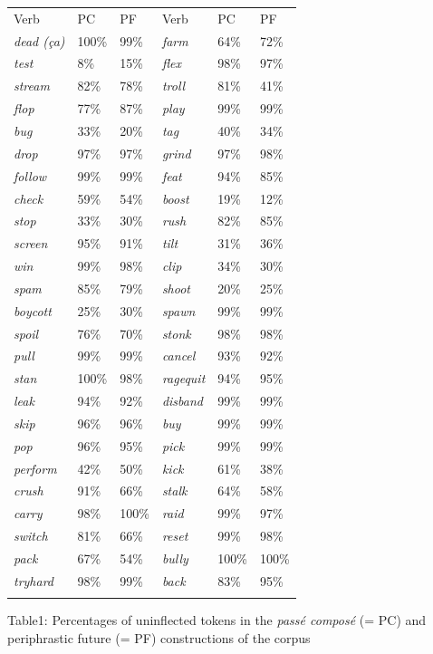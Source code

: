 \documentclass[output=paper]{langscibook}
\begin{document}
\begin{tabularx}{\textwidth}{XXXXXX}

\lsptoprule
Verb & PC & PF & Verb & PC & PF\\
\textit{dead (ça)} & 100\% & 99\% & \textit{farm} & 64\% & 72\%\\
\textit{test} & 8\% & 15\% & \textit{flex} & 98\% & 97\%\\
\textit{stream} & 82\% & 78\% & \textit{troll} & 81\% & 41\%\\
\textit{flop} & 77\% & 87\% & \textit{play} & 99\% & 99\%\\
\textit{bug} & 33\% & 20\% & \textit{tag} & 40\% & 34\%\\
\textit{drop} & 97\% & 97\% & \textit{grind} & 97\% & 98\%\\
\textit{follow} & 99\% & 99\% & \textit{feat} & 94\% & 85\%\\
\textit{check} & 59\% & 54\% & \textit{boost} & 19\% & 12\%\\
\textit{stop} & 33\% & 30\% & \textit{rush} & 82\% & 85\%\\
\textit{screen} & 95\% & 91\% & \textit{tilt} & 31\% & 36\%\\
\textit{win} & 99\% & 98\% & \textit{clip} & 34\% & 30\%\\
\textit{spam} & 85\% & 79\% & \textit{shoot} & 20\% & 25\%\\
\textit{boycott} & 25\% & 30\% & \textit{spawn} & 99\% & 99\%\\
\textit{spoil} & 76\% & 70\% & \textit{stonk} & 98\% & 98\%\\
\textit{pull} & 99\% & 99\% & \textit{cancel} & 93\% & 92\%\\
\textit{stan} & 100\% & 98\% & \textit{ragequit} & 94\% & 95\%\\
\textit{leak} & 94\% & 92\% & \textit{disband} & 99\% & 99\%\\
\textit{skip} & 96\% & 96\% & \textit{buy} & 99\% & 99\%\\
\textit{pop} & 96\% & 95\% & \textit{pick} & 99\% & 99\%\\
\textit{perform} & 42\% & 50\% & \textit{kick} & 61\% & 38\%\\
\textit{crush} & 91\% & 66\% & \textit{stalk} & 64\% & 58\%\\
\textit{carry} & 98\% & 100\% & \textit{raid} & 99\% & 97\%\\
\textit{switch} & 81\% & 66\% & \textit{reset} & 99\% & 98\%\\
\textit{pack} & 67\% & 54\% & \textit{bully} & 100\% & 100\%\\
\textit{tryhard} & 98\% & 99\% & \textit{back} & 83\% & 95\%\\
\lspbottomrule
\end{tabularx}
\begin{stylelsTableHeading}
Table1: Percentages of uninflected tokens in the \textit{passé composé} (= PC) and periphrastic future (= PF) constructions of the corpus
\end{stylelsTableHeading}
\end{document}
